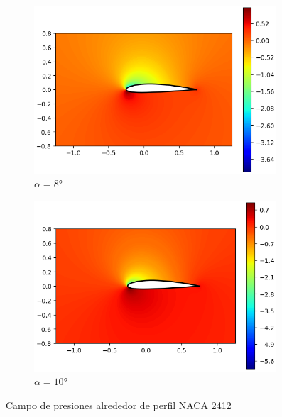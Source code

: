 \documentclass[letterpaper, openright, 12pt]{book}
\begin{document}
\begin{figure}[htbp!]
\begin{subfigure}[c]{0.48\textwidth}
            \includegraphics[keepaspectratio, width=0.99\textwidth]
                {./img/potential_flow_2412_cp_8}
            \caption{$\alpha = 8\si{\degree}$}
            \label{fig:potential_flow_2412_cp_8}
        \end{subfigure}
        \hfill
        \begin{subfigure}[c]{0.48\textwidth}
            \includegraphics[keepaspectratio, width=0.99\textwidth]
                {./img/potential_flow_2412_cp_10}
            \caption{$\alpha = 10\si{\degree}$}
        \end{subfigure}
        \caption{Campo de presiones alrededor de perfil NACA 2412}
        \label{fig:potential_flow_2412_cp__1}
    \end{figure}
\end{document}
